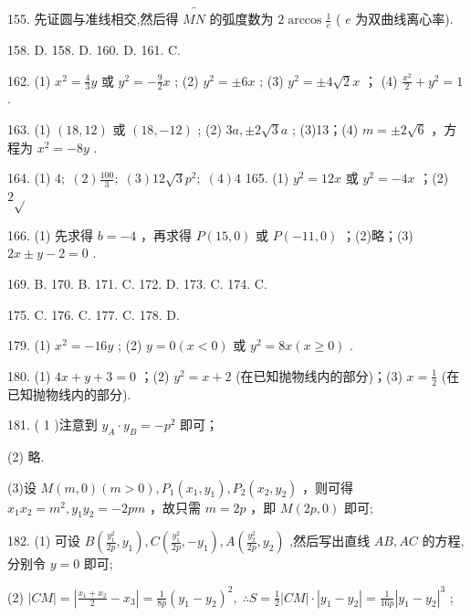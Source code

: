 \documentclass[10pt]{article}
\begin{document}
155. 先证圆与准线相交,然后得 \(\overset{\text{ ⏜ }}{MN}\) 的弧度数为 \(2\arccos \frac{1}{e}\) ( \(e\) 为双曲线离心率).

158. D. 158. D. 160. D. 161. C.

162. (1) \({x}^{2} = \frac{4}{3}y\) 或 \({y}^{2} =  - \frac{9}{2}x\) ; (2) \({y}^{2} =  \pm  {6x}\) ; (3) \({y}^{2} =  \pm  4\sqrt{2}x\) ； (4) \(\frac{{x}^{2}}{2} + {y}^{2} = 1\) .

163. (1) \(\left( {{18},{12}}\right)\) 或 \(\left( {{18}, - {12}}\right)\) ; (2) \({3a}, \pm  2\sqrt{3}a\) ; (3)13；(4) \(m =  \pm  2\sqrt{6}\) ，方程为 \({x}^{2} =  - {8y}\) .

164. (1) \(4;\;\left( 2\right) \frac{100}{3};\;\left( 3\right) {12}\sqrt{3}{p}^{2};\;\left( 4\right) 4\) 165. (1) \({y}^{2} = {12x}\) 或 \({y}^{2} =  - {4x}\) ；(2) \(2\sqrt{}\)

166. (1) 先求得 \(b =  - 4\) ，再求得 \(P\left( {{15},0}\right)\) 或 \(P\left( {-{11},0}\right)\) ；(2)略；(3) \({2x} \pm  y - 2 = 0\) .

169. B. 170. B. 171. C. 172. D. 173. C. 174. C.

175. C. 176. C. 177. C. 178. D.

179. (1) \({x}^{2} =  - {16y}\) ; (2) \(y = 0\left( {x < 0}\right)\) 或 \({y}^{2} = {8x}\left( {x \geq  0}\right)\) .

180. (1) \({4x} + y + 3 = 0\) ；(2) \({y}^{2} = x + 2\) (在已知抛物线内的部分)；(3) \(x = \frac{1}{2}\) (在已知抛物线内的部分).

181. ( 1 )注意到 \({y}_{A} \cdot  {y}_{B} =  - {p}^{2}\) 即可；

(2) 略.

(3)设 \(M\left( {m,0}\right) \left( {m > 0}\right) ,{P}_{1}\left( {{x}_{1},{y}_{1}}\right) ,{P}_{2}\left( {{x}_{2},{y}_{2}}\right)\) ，则可得 \({x}_{1}{x}_{2} = {m}^{2},{y}_{1}{y}_{2} =  - {2p}m\) ，故只需 \(m = {2p}\) ，即 \(M\left( {{2p},0}\right)\) 即可;

182. (1) 可设 \(B\left( {\frac{{y}_{1}^{2}}{2p},{y}_{1}}\right) ,C\left( {\frac{{y}_{1}^{2}}{2p}, - {y}_{1}}\right) ,A\left( {\frac{{y}_{2}^{2}}{2p},{y}_{2}}\right)\) ,然后写出直线 \({AB},{AC}\) 的方程,分别令 \(y = 0\) 即可;

(2) \(\left| {CM}\right|  = \left| {\frac{{x}_{1} + {x}_{2}}{2} - {x}_{3}}\right|  = \frac{1}{8p}{\left( {y}_{1} - {y}_{2}\right) }^{2},\;\therefore S = \frac{1}{2}\left| {CM}\right|  \cdot  \left| {{y}_{1} - {y}_{2}}\right|  = \frac{1}{16p}{\left| {y}_{1} - {y}_{2}\right| }^{3}\) ;
\end{document}
